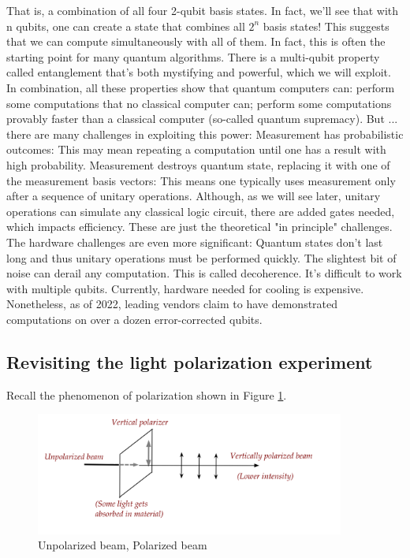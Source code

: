 \documentclass[main.tex]{subfiles}
\begin{document}
    That is, a combination of all four 2-qubit basis states. In fact, we'll see that with n qubits, one can create a state that combines all $2^{n}$ basis states! This suggests that we can compute simultaneously with all of them. In fact, this is often the starting point for many quantum algorithms. There is a multi-qubit property called entanglement that's both mystifying and powerful, which we will exploit. In combination, all these properties show that quantum computers can: perform some computations that no classical computer can; perform some computations provably faster than a classical computer (so-called quantum supremacy). But ... there are many challenges in exploiting this power: Measurement has probabilistic outcomes: This may mean repeating a computation until one has a result with high probability. Measurement destroys quantum state, replacing it with one of the measurement basis vectors: This means one typically uses measurement only after a sequence of unitary operations. Although, as we will see later, unitary operations can simulate any classical logic circuit, there are added gates needed, which impacts efficiency. These are just the theoretical "in principle" challenges. The hardware challenges are even more significant: Quantum states don't last long and thus unitary operations must be performed quickly. The slightest bit of noise can derail any computation. This is called decoherence. It's difficult to work with multiple qubits. Currently, hardware needed for cooling is expensive. Nonetheless, as of 2022, leading vendors claim to have demonstrated computations on over a dozen error-corrected qubits.

\subsection{Revisiting the light polarization experiment}

    Recall the phenomenon of polarization shown in Figure \ref{fig:23polarizer1}.
    
    \begin{figure}
        \centering
        \includegraphics[width=4in]{notes/figs/n05/23polarizer1.png}
        \caption{Unpolarized beam, Polarized beam}
        \label{fig:23polarizer1}
    \end{figure}
    
\end{document}
